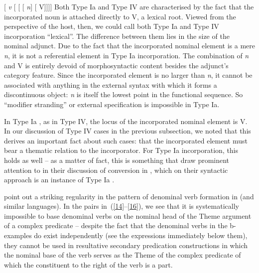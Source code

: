 \documentclass[output=paper]{langsci/langscibook}
\begin{document}
\begin{refcontext}
\ea  {}[ \emph{v}\tss{\{[+V], \Acc{}, \ldots{}\}} [
[ [ \hspace{-.7ex}\emph{n}\tss{\{[+N]\}}] [ \hspace{-.7ex}V]]]]\label{13}
\z
Both Type Ia and Type IV  are characterised by the
fact that the incorporated noun is attached directly to V, a lexical root.
Viewed from the perspective of the host, then, we could call both Type
Ia and Type IV incorporation \enquote{lexical}. The difference between
them lies in the size of the nominal adjunct. Due to the fact that the
incorporated nominal element is a mere \emph{n}, it is not a referential
element in Type Ia incorporation. The combination of \emph{n} and V is
entirely devoid of morphosyntactic content besides the adjunct's category
feature. Since the incorporated element is no larger than \emph{n}, it cannot
be associated with anything in the external syntax with which it forms a
discontinuous object: \emph{n} is itself the lowest point in the functional
sequence. So \enquote{modifier stranding} or external specification is
impossible in Type Ia.

In Type Ia , as in Type IV, the locus of the
incorporated nominal element is V. In our discussion of Type IV cases in the
previous subsection, we noted that this derives an important fact about such
cases: that the incorporated element must bear a thematic relation to the
incorporator. For Type Ia incorporation, this holds as well -- as a
matter of fact, this is something that \citet{halekeyser} draw prominent
attention to in their discussion of conversion in , which on their
syntactic approach is an instance of Type Ia .

\citet{halekeyser} point out a striking regularity in the pattern of denominal
verb formation in  (and similar languages). In the pairs
in~(\ref{14}--\ref{16}), we see that it is systematically impossible to base
denominal verbs on the nominal head of the Theme argument of a complex
predicate -- despite the fact that the denominal verbs in the b-examples do
exist independently (see the expressions immediately below them), they cannot
be used in resultative secondary predication constructions in which the nominal
base of the verb serves as the Theme of the complex predicate of which the
constituent to the right of the verb is a part.


\end{refcontext}
\end{document}
